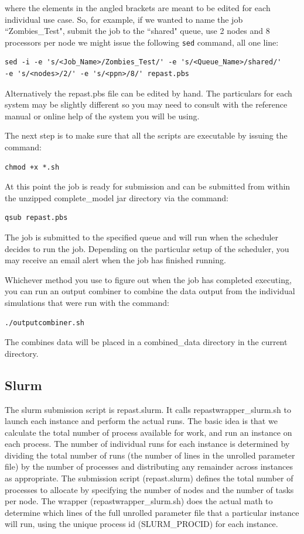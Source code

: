 \documentclass[11pt]{amsart}
\begin{document}
\noindent where the elements in the angled brackets are meant to be edited for each individual use case. So, for example, if we wanted to name the job ``Zombies\_Test", submit the job to the ``shared" queue,  use 2 nodes and 8 processors per node we might issue the following \texttt{sed} command, all one line:
\begin{verbatim}
sed -i -e 's/<Job_Name>/Zombies_Test/' -e 's/<Queue_Name>/shared/'
-e 's/<nodes>/2/' -e 's/<ppn>/8/' repast.pbs
\end{verbatim}
Alternatively the repast.pbs file can be edited by hand. The particulars for each system may be slightly different so you may need to consult with the reference manual or online help of the system you will be using.

The next step is to make sure that all the scripts are executable by issuing the command:
\begin{verbatim}
chmod +x *.sh
\end{verbatim}
At this point the job is ready for submission and can be submitted from within the unzipped complete\_model jar directory via the command:
\begin{verbatim}
qsub repast.pbs
\end{verbatim}

The job is submitted to the specified queue and will run when the scheduler decides to run the job. Depending on the particular setup of the scheduler, you may receive an email alert when the job has finished running. 

Whichever method you use to figure out when the job has completed executing, you can run an output combiner to combine the data output from the individual simulations that were run with the command:
\begin{verbatim}
./outputcombiner.sh
\end{verbatim}
The combines data will be placed in a combined\_data directory in the current directory.

\subsection{Slurm}
The slurm submission script is repast.slurm. It calls repastwrapper\_slurm.sh to launch each instance and perform the actual runs. The basic idea is that we calculate the total number of process available for work, and run an instance on each process. The number of individual runs for each instance is determined by dividing the total number of runs (the number of lines in the unrolled parameter file) by the number of processes and distributing any remainder across instances as appropriate.  The submission script (repast.slurm) defines the total number of processes to allocate by specifying the number of nodes and the number of tasks per node. The wrapper (repastwrapper\_slurm.sh) does the actual math to determine which lines of the full unrolled parameter file that a particular instance will run, using the unique process id (SLURM\_PROCID) for each instance.
\end{document}
